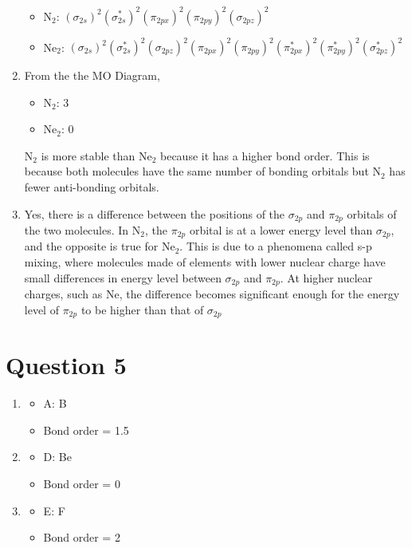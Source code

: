 \documentclass[a4paper, fleqn]{article}
\begin{document}
\begin{enumerate}[label=(\alph{*})]
\begin{itemize}
\item N$_2$: $(\sigma_{2s})^2(\sigma_{2s}^*)^2(\pi_{2px})^2(\pi_{2py})^2(\sigma_{2pz})^2$
\item Ne$_2$: $(\sigma_{2s})^2(\sigma_{2s}^*)^2(\sigma_{2pz})^2(\pi_{2px})^2(\pi_{2py})^2(\pi_{2px}^*)^2(\pi_{2py}^*)^2(\sigma_{2pz}^*)^2$
\end{itemize}
\item From the the MO Diagram, \begin{itemize}
\item N$_2$: 3
\item Ne$_2$: 0
\end{itemize}
N$_2$ is more stable than Ne$_2$ because it has a higher bond order. This is because both molecules have the same number of bonding orbitals but N$_2$ has fewer anti-bonding orbitals.
\item Yes, there is a difference between the positions of the $\sigma_{2p}$ and $\pi_{2p}$ orbitals of the two molecules. In N$_2$, the $\pi_{2p}$ orbital is at a lower energy level than $\sigma_{2p}$, and the opposite is true for Ne$_2$. This is due to a phenomena called s-p mixing, where molecules made of elements with lower nuclear charge have small differences in energy level between $\sigma_{2p}$ and $\pi_{2p}$. At higher nuclear charges, such as Ne, the difference becomes significant enough for the energy level of $\pi_{2p}$ to be higher than that of $\sigma_{2p}$
\end{enumerate}

\section{Question 5}
\begin{enumerate}[label=(\alph{*})]
\item \begin{itemize}
\item A: B
\item Bond order = 1.5
\end{itemize}
\item \begin{itemize}
\item D: Be
\item Bond order = 0
\end{itemize}
\item \begin{itemize}
\item E: F
\item Bond order = 2
\end{itemize} 
\end{enumerate}
\pagebreak
\end{document}
